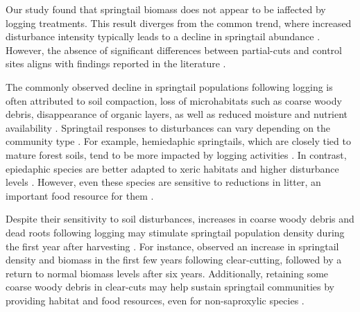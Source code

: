 
Our study found that springtail biomass does not appear to be iaffected by logging treatments. 
This result diverges from the common trend, where increased disturbance intensity typically leads to a decline in springtail abundance \citep{Lindo2004Forestfloor,Laigle2021Directindirect,Kudrin2023metaanalysiseffects}. 
However, the absence of significant differences between partial-cuts and control sites aligns with findings reported in the literature \citep{Kudrin2023metaanalysiseffects}. 

The commonly observed decline in springtail populations following logging is often attributed to soil compaction, loss of microhabitats such as coarse woody debris, 
disappearance of organic layers, as well as reduced moisture and nutrient availability \citep{Bird1986Effectwholetree,Baath1995Microbialcommunity,Lindo2004Forestfloor,rousseauForestFloorMesofauna2018}. 
Springtail responses to disturbances can vary depending on the community type \citep{raymond-leonardSpringtailCommunityStructure2018a}. 
For example, hemiedaphic springtails, which are closely tied to mature forest soils, tend to be more impacted by logging activities \citep{Laigle2021Directindirect}. 
In contrast, epiedaphic species are better adapted to xeric habitats and higher disturbance levels \citep{Makkonen2011Traitsexplain,rousseauWoodyBiomassRemoval2019}. 
However, even these species are sensitive to reductions in litter, an important food resource for them \citep{rousseauForestFloorMesofauna2018}. 

Despite their sensitivity to soil disturbances, increases in coarse woody debris and dead roots following logging may stimulate springtail population density 
during the first year after harvesting \citep{Bird1986Effectwholetree,Marshall2000Impactsforest}. 
For instance, \cite{Huhta1976Effectsclearcutting} observed an increase in springtail density and biomass in the first few years following clear-cutting, 
followed by a return to normal biomass levels after six years. 
Additionally, retaining some coarse woody debris in clear-cuts may help sustain springtail communities by providing habitat and food resources, 
even for non-saproxylic species \citep{rousseauForestFloorMesofauna2018,Raymond-Leonard2020Deadwood}. 



